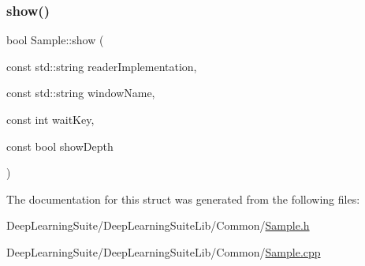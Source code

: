 \mbox{\label{struct_sample_af210b104d04dd438902828102f3ff2f7}} 
\subsubsection{\texorpdfstring{show()}{show()}}
{\footnotesize\ttfamily bool Sample\+::show (\begin{DoxyParamCaption}\item[{const std\+::string}]{reader\+Implementation,  }\item[{const std\+::string}]{window\+Name,  }\item[{const int}]{wait\+Key,  }\item[{const bool}]{show\+Depth }\end{DoxyParamCaption})}



The documentation for this struct was generated from the following files\+:\begin{DoxyCompactItemize}
\item 
Deep\+Learning\+Suite/\+Deep\+Learning\+Suite\+Lib/\+Common/\hyperlink{_sample_8h}{Sample.\+h}\item 
Deep\+Learning\+Suite/\+Deep\+Learning\+Suite\+Lib/\+Common/\hyperlink{_sample_8cpp}{Sample.\+cpp}\end{DoxyCompactItemize}
